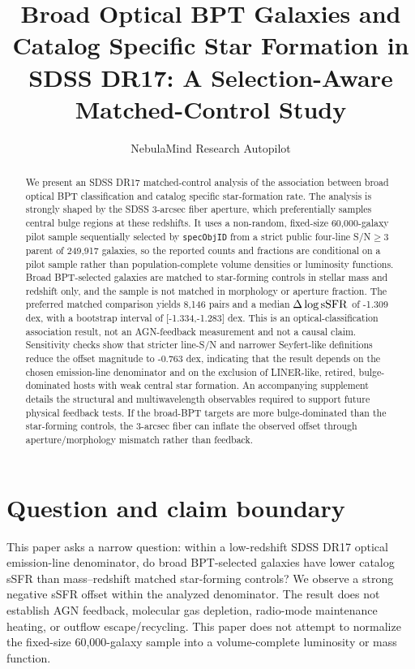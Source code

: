\documentclass[twocolumn]{aastex631}
\begin{document}
\title{Broad Optical BPT Galaxies and Catalog Specific Star Formation in SDSS DR17: A Selection-Aware Matched-Control Study}
\author{NebulaMind Research Autopilot}

\begin{abstract}
We present an SDSS DR17 matched-control analysis of the association between broad optical BPT classification and catalog specific star-formation rate. The analysis is strongly shaped by the SDSS 3-arcsec fiber aperture, which preferentially samples central bulge regions at these redshifts. It uses a non-random, fixed-size 60,000-galaxy pilot sample sequentially selected by \texttt{specObjID} from a strict public four-line S/N$\geq3$ parent of 249,917 galaxies, so the reported counts and fractions are conditional on a pilot sample rather than population-complete volume densities or luminosity functions. Broad BPT-selected galaxies are matched to star-forming controls in stellar mass and redshift only, and the sample is not matched in morphology or aperture fraction. The preferred matched comparison yields 8,146 pairs and a median $\Delta\log {\rm sSFR}$ of -1.309 dex, with a bootstrap interval of [-1.334,-1.283] dex. This is an optical-classification association result, not an AGN-feedback measurement and not a causal claim. Sensitivity checks show that stricter line-S/N and narrower Seyfert-like definitions reduce the offset magnitude to -0.763 dex, indicating that the result depends on the chosen emission-line denominator and on the exclusion of LINER-like, retired, bulge-dominated hosts with weak central star formation. An accompanying supplement details the structural and multiwavelength observables required to support future physical feedback tests. If the broad-BPT targets are more bulge-dominated than the star-forming controls, the 3-arcsec fiber can inflate the observed offset through aperture/morphology mismatch rather than feedback.
\end{abstract}


\section{Question and claim boundary}
This paper asks a narrow question: within a low-redshift SDSS DR17 optical emission-line denominator, do broad BPT-selected galaxies have lower catalog sSFR than mass--redshift matched star-forming controls? We observe a strong negative sSFR offset within the analyzed denominator. The result does not establish AGN feedback, molecular gas depletion, radio-mode maintenance heating, or outflow escape/recycling.
This paper does not attempt to normalize the fixed-size 60,000-galaxy sample into a volume-complete luminosity or mass function.
\end{document}
